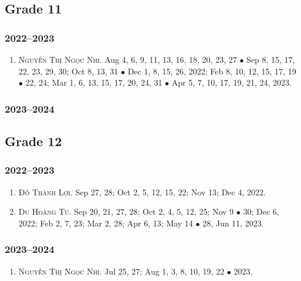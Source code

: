 \documentclass{article}
\begin{document}
\subsection{Grade 11}

\subsubsection{2022--2023}

\begin{enumerate}
	\item \textsc{Nguyễn Thị Ngọc Nhi.} {\sf[In]} Aug 4, 6, 9, 11, 13, 16, 18, 20, 23, 27 $\bullet$ Sep 8, 15, 17, 22, 23, 29, 30; Oct 8, 13, 31 $\bullet$ Dec 1, 8,  15, 26, 2022; Feb 8, 10, 12, 15, 17, 19 $\bullet$ 22, 24; Mar 1, 6, 13, 15, 17, 20, 24, 31 $\bullet$ Apr 5, 7, 10, 17, 19, 21, 24, 2023. {\sf[Out]}
\end{enumerate}

\subsubsection{2023--2024}


\subsection{Grade 12}

\subsubsection{2022--2023}

\begin{enumerate}
	\item \textsc{Đỗ Thành Lợi.} {\sf[In]} Sep 27, 28; Oct 2, 5, 12, 15, 22; Nov 13; Dec 4, 2022. {\sf[Out]}
	\item \textsc{Du Hoàng Tú.} {\sf[In]} Sep 20, 21, 27, 28; Oct 2, 4, 5, 12, 25; Nov 9 $\bullet$ 30; Dec 6, 2022; Feb 2, 7, 23; Mar 2, 28; Apr 6, 13; May 14 $\bullet$ 28, Jun 11, 2023. {\sf[Out]}
\end{enumerate}

\subsubsection{2023--2024}

\begin{enumerate}	
	\item \textsc{Nguyễn Thị Ngọc Nhi.} {\sf[In]} Jul 25, 27; Aug 1, 3, 8, 10, 19, 22 $\bullet$ 2023. {\sf[Out]}
\end{enumerate}
\end{document}
